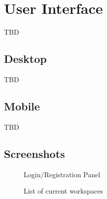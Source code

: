 \section{User Interface}
TBD

\subsection{Desktop}
TBD

\subsection{Mobile}
TBD

\subsection{Screenshots}

\begin{figure}[!htb]
    \centering
    \caption{Login/Registration Panel}
    \label{fig:login}
\end{figure}

\begin{figure}[!htb]
    \centering
    \caption{List of current workspaces}
    \label{fig:workspaces-list}
\end{figure}

